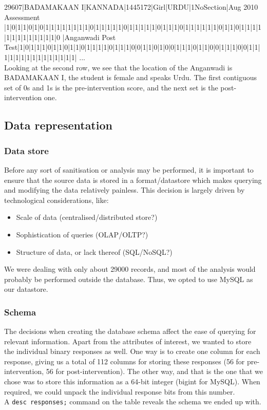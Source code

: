 \documentclass[10pt]{article}
\begin{document}
{\footnotesize 29607|BADAMAKAAN I|KANNADA|1445172|Girl|URDU|1NoSection|Aug 2010 Assessment
|1|0|1|1|0|1|0|1|1|1|1|1|1|1|1|0|1|1|1|1|1|0|1|1|1|1|1|0|1|1|1|0|1|1|1|1|1|1|0|1|1|0|1|1|1|1|1|1|1|1|1|1|1|1|1|0
|Anganwadi Post Test|1|0|1|1|1|0|1|1|0|1|1|0|1|1|1|1|0|1|1|1|0|0|1|1|0|1|0|0|1|1|1|0|1|1|0|0|1|1|1|0|0|1|1|1|1|1|1|1|1|1|1|1|1|1|1|1|
...
}\\

Looking at the second row, we see that the location of the Anganwadi is BADAMAKAAN I, the student is female and speaks Urdu. The first contiguous set of 0s and 1s is the pre-intervention score, and the next set is the post-intervention one.

\newpage
\subsection{Data representation}
\subsubsection{Data store}
Before any sort of sanitisation or analysis may be performed, it is important to ensure that the source data is stored in a format/datastore which makes querying and modifying the data relatively painless. This decision is largely driven by technological considerations, like:

\begin{itemize}
\item Scale of data (centralised/distributed store?)
\item Sophistication of queries (OLAP/OLTP?)
\item Structure of data, or lack thereof (SQL/NoSQL?)
\end{itemize}

We were dealing with only about 29000 records, and most of the analysis would probably be performed outside the database. Thus, we opted to use MySQL as our datastore.

\subsubsection{Schema}
The decisions when creating the database schema affect the ease of querying for relevant information. Apart from the attributes of interest, we wanted to store the individual binary responses as well. One way is to create one column for each response, giving us a total of 112 columns for storing these responses (56 for pre-intervention, 56 for post-intervention). The other way, and that is the one that we chose was to store this information as a 64-bit integer (bigint for MySQL). When required, we could unpack the individual response bits from this number.\\
A {\tt desc responses;} command on the table reveals the schema we ended up with.
\end{document}
